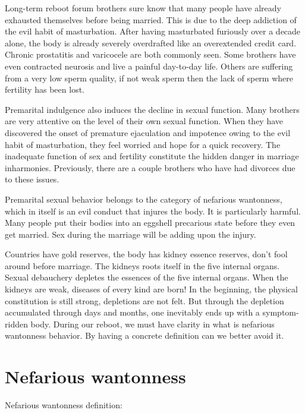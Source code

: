 \documentclass[
]{book}
\begin{document}
Long-term reboot forum brothers sure know that many people have already exhausted themselves before being married. This is due to the deep addiction of the evil habit of masturbation. After having masturbated furiously over a decade alone, the body is already severely overdrafted like an overextended credit card. Chronic prostatitis and varicocele are both commonly seen. Some brothers have even contracted neurosis and live a painful day-to-day life. Others are suffering from a very low sperm quality, if not weak sperm then the lack of sperm where fertility has been lost.

Premarital indulgence also induces the decline in sexual function. Many brothers are very attentive on the level of their own sexual function. When they have discovered the onset of premature ejaculation and impotence owing to the evil habit of masturbation, they feel worried and hope for a quick recovery. The inadequate function of sex and fertility constitute the hidden danger in marriage inharmonies. Previously, there are a couple brothers who have had divorces due to these issues.

Premarital sexual behavior belongs to the category of nefarious wantonness, which in itself is an evil conduct that injures the body. It is particularly harmful. Many people put their bodies into an eggshell precarious state before they even get married. Sex during the marriage will be adding upon the injury.

Countries have gold reserves, the body has kidney essence reserves, don't fool around before marriage. The kidneys roots itself in the five internal organs. Sexual debauchery depletes the essences of the five internal organs. When the kidneys are weak, diseases of every kind are born! In the beginning, the physical constitution is still strong, depletions are not felt. But through the depletion accumulated through days and months, one inevitably ends up with a symptom-ridden body. During our reboot, we must have clarity in what is nefarious wantonness behavior. By having a concrete definition can we better avoid it.

\hypertarget{nefarious-wantonness}{%
\section{Nefarious wantonness}\label{nefarious-wantonness}}

Nefarious wantonness definition:
\end{document}
